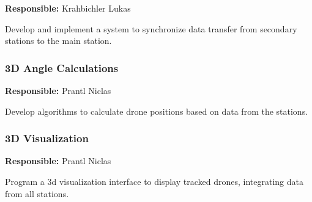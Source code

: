 \textbf{Responsible:} Krahbichler Lukas

Develop and implement a system to synchronize data transfer from secondary stations to the main station.

\subsubsection{3D Angle Calculations}

\textbf{Responsible:} Prantl Niclas

Develop algorithms to calculate drone positions based on data from the stations.

\subsubsection{3D Visualization}

\textbf{Responsible:} Prantl Niclas

Program a \acrshort{3d} visualization interface to display tracked drones, integrating data from all stations.
